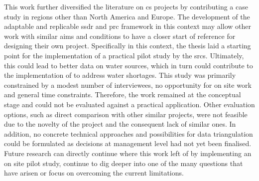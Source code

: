 This work further diversified the literature on \acrlong{cs} projects by contributing a case study in regions other than North America and Europe. The development of the adaptable and replicable \acrlong{ssdr} and \acrlong{prc} framework in this context may allow other work with similar aims and conditions to have a closer start of reference for designing their own project. Specifically in this context, the thesis laid a starting point for the implementation of a practical pilot study by the \acrlong{srcs}. Ultimately, this could lead to better data on water sources, which in turn could contribute to the implementation of  to address water shortages. \newline
This study was primarily constrained by a modest number of interviewees, no opportunity for on site work and general time constraints. Therefore, the work remained at the conceptual stage and could not be evaluated against a practical application. Other evaluation options, such as direct comparison with other similar projects, were not feasible due to the novelty of the project and the consequent lack of similar ones. In addition, no concrete technical approaches and possibilities for data triangulation could be formulated as decisions at management level had not yet been finalised.\newline
Future research can directly continue where this work left of by implementing an on site pilot study, continue to dig deeper into one of the many questions that have arisen or focus on overcoming the current limitations.
